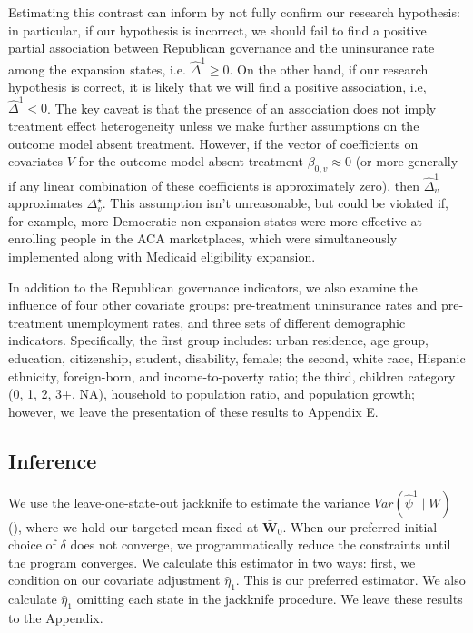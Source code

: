 \documentclass[aoas]{imsart}
\theoremstyle{plain}
\newcommand{\matr}[1]{\mathbf{#1}} %
\theoremstyle{remark}
\begin{document}
Estimating this contrast can inform by not fully confirm our research hypothesis: in particular, if our hypothesis is incorrect, we should fail to find a positive partial association between Republican governance and the uninsurance rate among the expansion states, i.e. $\hat{\Delta}^1 \ge 0$. On the other hand, if our research hypothesis is correct, it is likely that we will find a positive association, i.e, $\hat{\Delta}^1 < 0$. The key caveat is that the presence of an association does not imply treatment effect heterogeneity unless we make further assumptions on the outcome model absent treatment. However, if the vector of coefficients on covariates $V$ for the outcome model absent treatment $\beta_{0, v} \approx 0$ (or more generally if any linear combination of these coefficients is approximately zero), then $\hat{\Delta}^1_v$ approximates $\Delta^\star_v$. This assumption isn't unreasonable, but could be violated if, for example, more Democratic non-expansion states were more effective at enrolling people in the ACA marketplaces, which were simultaneously implemented along with Medicaid eligibility expansion. 

In addition to the Republican governance indicators, we also examine the influence of four other covariate groups: pre-treatment uninsurance rates and pre-treatment unemployment rates, and three sets of different demographic indicators. Specifically, the first group includes: urban residence, age group, education, citizenship, student, disability, female; the second, white race, Hispanic ethnicity, foreign-born, and income-to-poverty ratio; the third, children category (0, 1, 2, 3+, NA), household to population ratio, and population growth; however, we leave the presentation of these results to Appendix E.

\subsection{Inference}

We use the leave-one-state-out jackknife to estimate the variance $Var(\hat{\psi}^1 \mid W)$ (\cite{cameron2015practitioner}), where we hold our targeted mean fixed at $\bar{\matr{W}}_0$. When our preferred initial choice of $\delta$ does not converge, we programmatically reduce the constraints until the program converges. We calculate this estimator in two ways: first, we condition on our covariate adjustment $\hat{\eta}_1$. This is our preferred estimator. We also calculate $\hat{\eta}_1$ omitting each state in the jackknife procedure. We leave these results to the Appendix.
\end{document}
